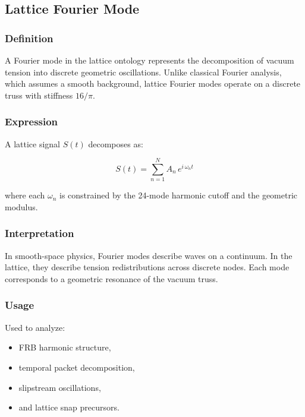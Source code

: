 \documentclass[12pt,oneside]{book}
\begin{document}

\subsection{Lattice Fourier Mode}

\subsubsection{Definition}
A Fourier mode in the lattice ontology represents the decomposition of vacuum tension into
discrete geometric oscillations. Unlike classical Fourier analysis, which assumes a smooth
background, lattice Fourier modes operate on a discrete truss with stiffness $16/\pi$.

\subsubsection{Expression}
A lattice signal $S(t)$ decomposes as:


\[
S(t) = \sum_{n=1}^{N} A_n \, e^{i \, \omega_n t}
\]


where each $\omega_n$ is constrained by the 24-mode harmonic cutoff and the geometric modulus.

\subsubsection{Interpretation}
In smooth-space physics, Fourier modes describe waves on a continuum.  
In the lattice, they describe tension redistributions across discrete nodes.  
Each mode corresponds to a geometric resonance of the vacuum truss.

\subsubsection{Usage}
Used to analyze:
\begin{itemize}
    \item FRB harmonic structure,
    \item temporal packet decomposition,
    \item slipstream oscillations,
    \item and lattice snap precursors.
\end{itemize}

\end{document}
